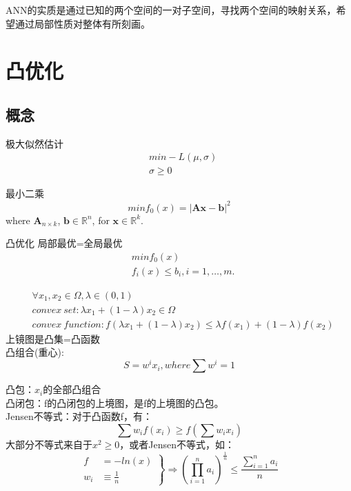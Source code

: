 \documentclass[UTF8]{article}
\begin{document}
ANN的实质是通过已知的两个空间的一对子空间，寻找两个空间的映射关系，希望通过局部性质对整体有所刻画。


\section{凸优化}
\subsection{概念}

极大似然估计
\begin{equation}
\begin{split}
&min -L \left( \mu ,\sigma \right)\\
&\sigma \geqslant 0
\end{split}
\end{equation}

最小二乘
\begin{equation}
min f_0(x)=\left| \mathbf {Ax-b} \right|^2
\end{equation}
where $\mathbf A_{n \times k}$, $\mathbf b\in \mathbb R^n$, for $\mathbf x\in \mathbb R^k$.

凸优化 局部最优=全局最优
\begin{equation}
    \begin{split}
    &minf_0(x) \\
    &f_i(x) \leqslant b_i,i=1,\dots,m.
    \end{split}
\end{equation} 

\begin{equation}
\begin{split}
&\forall x_1,x_2 \in \Omega,\lambda \in (0,1)\\
&convex \ set: \lambda x_1 +(1-\lambda)x_2 \in \Omega\\
&convex \ function: f \left( \lambda x_1+(1-\lambda)x_2 \right)\leqslant
\lambda f(x_1)+(1-\lambda)f(x_2)
\end{split}
\end{equation}
上镜图是凸集=凸函数\\   

凸组合(重心):
\begin{equation}
S=w^ix_i, where \sum w^i=1
\end{equation} 

凸包：$x_i$的全部凸组合\\
凸闭包：f的凸闭包的上境图，是f的上境图的凸包。\\
Jensen不等式：对于凸函数f，有：
\begin{equation}
\sum w_if \left( x_i \right)\geqslant f \left( \sum w_ix_i \right)
\end{equation}
大部分不等式来自于$ x^2\geqslant0$，或者Jensen不等式，如：
\begin{equation}
\left.
\begin{aligned}
f&=-ln(x) \\
w_i& \equiv \frac{1}{n}
\end{aligned}
 \right\} \Rightarrow
 \left( \prod_{i=1}^{n} a_i  \right)^{\frac{1}{n}}\leqslant \frac{\sum\limits_{i=1}^na_i}{n}
\end{equation}
\end{document}
